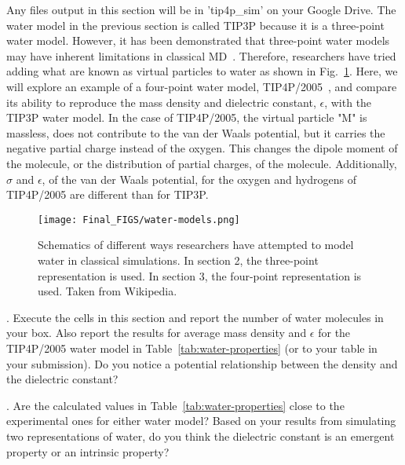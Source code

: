 \documentclass{article}
\begin{document}
Any files output in this section will be in 'tip4p\_sim' on your Google Drive. The water model in the previous section is called TIP3P because it is a three-point water model. However, it has been demonstrated that three-point water models may have inherent limitations in classical MD~\cite{Izadi_JCP_2016}. Therefore, researchers have tried adding what are known as virtual particles to water as shown in Fig.~\ref{fig:water-models}. Here, we will explore an example of a four-point water model, TIP4P/2005~\cite{Abascal_JCP_2005}, and compare its ability to reproduce the mass density and dielectric constant, $\epsilon$, with the TIP3P water model. In the case of TIP4P/2005, the virtual particle "M" is massless, does not contribute to the van der Waals potential, but it carries the negative partial charge instead of the oxygen. This changes the dipole moment of the molecule, or the distribution of partial charges, of the molecule. Additionally, $\sigma$ and $\epsilon$, of the van der Waals potential, for the oxygen and hydrogens of TIP4P/2005 are different than for TIP3P.

\begin{figure}[H]
    \centering
    \texttt{[image: Final\_FIGS/water-models.png]}
    \caption{Schematics of different ways researchers have attempted to model water in classical simulations. In section 2, the three-point representation is used. In section 3, the four-point representation is used. Taken from Wikipedia.}
    \label{fig:water-models}
\end{figure}

\vspace*{1cm}
. Execute the cells in this section and report the number of water molecules in your box. Also report the results for average mass density and $\epsilon$ for the TIP4P/2005 water model in Table~\ref{tab:water-properties} (or to your table in your submission). Do you notice a potential relationship between the density and the dielectric constant?

\vspace*{1cm}
. Are the calculated values in Table~\ref{tab:water-properties} close to the experimental ones for either water model? Based on your results from simulating two representations of water, do you think the dielectric constant is an emergent property or an intrinsic property? 
\end{document}
